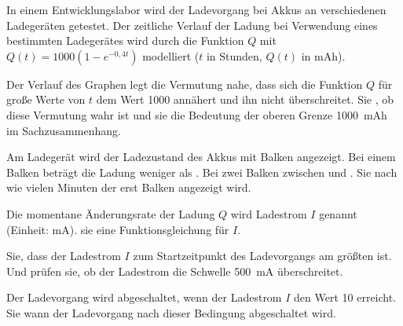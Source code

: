 \documentclass[11pt, a5paper, landscape, final]{scrartcl}
\begin{document}
	\begin{aufgabe}
		In einem Entwicklungslabor wird der Ladevorgang bei Akkus an verschiedenen Ladegeräten getestet. Der zeitliche Verlauf der Ladung bei Verwendung eines bestimmten Ladegerätes wird durch die Funktion $Q$ mit $Q(t) = 1000(1-e^{-0,4t})$ modelliert ($t$ in Stunden, $Q(t)$ in \si{mAh}).
		
		\begin{smallenumerate}
			\item Der Verlauf des Graphen legt die Vermutung nahe, dass sich die Funktion $Q$ für große Werte von $t$ dem Wert \num{1000} annähert und ihn nicht überschreitet.  Sie , ob diese Vermutung wahr ist und  sie die Bedeutung der oberen Grenze \SI{1000}{mAh} im Sachzusammenhang.
			
			\item Am Ladegerät wird der Ladezustand des Akkus mit Balken angezeigt. Bei einem Balken beträgt die Ladung weniger als . Bei zwei Balken zwischen  und .  Sie nach wie vielen Minuten der erst Balken angezeigt wird.
			
			\item Die momentane Änderungsrate der Ladung $Q$ wird Ladestrom $I$ genannt (Einheit: \si{mA}).  sie eine Funktionsgleichung für $I$.
			
			\item {} Sie, dass der Ladestrom $I$ zum Startzeitpunkt des Ladevorgangs am größten ist. Und prüfen sie, ob der Ladestrom die Schwelle \SI{500}{mA} überschreitet.
			
			\item Der Ladevorgang wird abgeschaltet, wenn der Ladestrom $I$ den Wert \num{10} erreicht.  Sie wann der Ladevorgang nach dieser Bedingung abgeschaltet wird.
		\end{smallenumerate}
	\end{aufgabe}
	\clearpage
	
\end{document}
